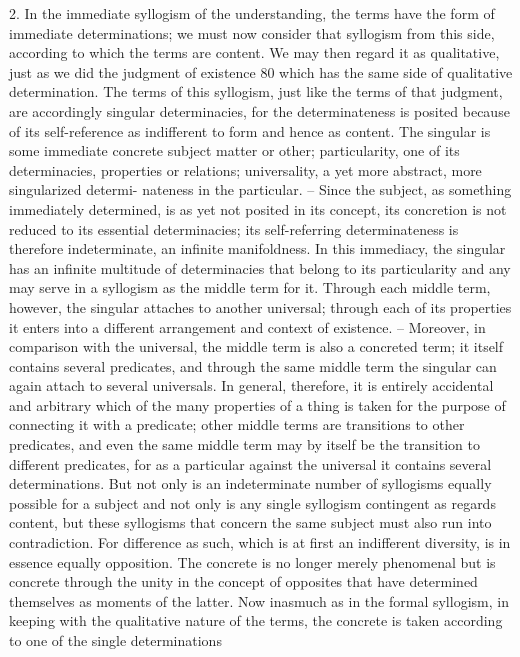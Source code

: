 2. In the immediate syllogism of the understanding, the terms have the
form of immediate determinations; we must now consider that syllogism
from this side, according to which the terms are content. We may then
regard it as qualitative, just as we did the judgment of existence 80 which
has the same side of qualitative determination. The terms of this syllogism,
just like the terms of that judgment, are accordingly singular determinacies,
for the determinateness is posited because of its self-reference as indifferent
to form and hence as content. The singular is some immediate concrete
subject matter or other; particularity, one of its determinacies, properties
or relations; universality, a yet more abstract, more singularized determi-
nateness in the particular. – Since the subject, as something immediately
determined, is as yet not posited in its concept, its concretion is not reduced
to its essential determinacies; its self-referring determinateness is therefore
indeterminate, an infinite manifoldness. In this immediacy, the singular
has an infinite multitude of determinacies that belong to its particularity
and any may serve in a syllogism as the middle term for it. Through each
middle term, however, the singular attaches to another universal; through
each of its properties it enters into a different arrangement and context of
existence. – Moreover, in comparison with the universal, the middle term
is also a concreted term; it itself contains several predicates, and through
the same middle term the singular can again attach to several universals.
In general, therefore, it is entirely accidental and arbitrary which of the
many properties of a thing is taken for the purpose of connecting it with a
predicate; other middle terms are transitions to other predicates, and even
the same middle term may by itself be the transition to different predicates,
for as a particular against the universal it contains several determinations.
But not only is an indeterminate number of syllogisms equally possible
for a subject and not only is any single syllogism contingent as regards
content, but these syllogisms that concern the same subject must also run
into contradiction. For difference as such, which is at first an indifferent
diversity, is in essence equally opposition. The concrete is no longer merely
phenomenal but is concrete through the unity in the concept of opposites
that have determined themselves as moments of the latter. Now inasmuch
as in the formal syllogism, in keeping with the qualitative nature of the
terms, the concrete is taken according to one of the single determinations
